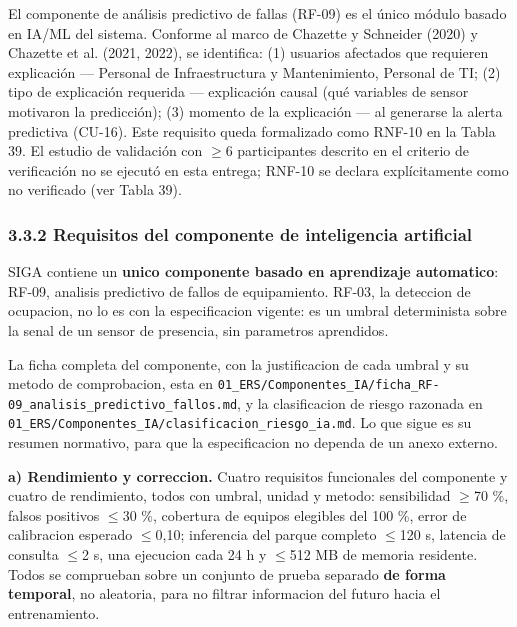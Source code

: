 
El componente de análisis predictivo de fallas (RF-09) es el único módulo basado en IA/ML del sistema. Conforme al marco de Chazette y Schneider (2020) y Chazette et al. (2021, 2022), se identifica: (1) usuarios afectados que requieren explicación --- Personal de Infraestructura y Mantenimiento, Personal de TI; (2) tipo de explicación requerida --- explicación causal (qué variables de sensor motivaron la predicción); (3) momento de la explicación --- al generarse la alerta predictiva (CU-16). Este requisito queda formalizado como RNF-10 en la Tabla 39. El estudio de validación con $\geq$6 participantes descrito en el criterio de verificación no se ejecutó en esta entrega; RNF-10 se declara explícitamente como no verificado (ver Tabla 39).


\subsubsection*{3.3.2 Requisitos del componente de inteligencia artificial}


SIGA contiene un \textbf{unico componente basado en aprendizaje automatico}: RF-09,
analisis predictivo de fallos de equipamiento. RF-03, la deteccion de ocupacion, no lo es
con la especificacion vigente: es un umbral determinista sobre la senal de un sensor de
presencia, sin parametros aprendidos.

La ficha completa del componente, con la justificacion de cada umbral y su metodo de
comprobacion, esta en \nolinkurl{01_ERS/Componentes_IA/ficha_RF-09_analisis_predictivo_fallos.md},
y la clasificacion de riesgo razonada en
\nolinkurl{01_ERS/Componentes_IA/clasificacion_riesgo_ia.md}. Lo que sigue es su resumen
normativo, para que la especificacion no dependa de un anexo externo.

\medskip
\noindent\textbf{a) Rendimiento y correccion.} Cuatro requisitos funcionales del
componente y cuatro de rendimiento, todos con umbral, unidad y metodo: sensibilidad
$\geq$70 \%, falsos positivos $\leq$30 \%, cobertura de equipos elegibles del 100 \%,
error de calibracion esperado $\leq$0,10; inferencia del parque completo $\leq$120 s,
latencia de consulta $\leq$2 s, una ejecucion cada 24 h y $\leq$512 MB de memoria
residente. Todos se comprueban sobre un conjunto de prueba separado \textbf{de forma
temporal}, no aleatoria, para no filtrar informacion del futuro hacia el entrenamiento.

